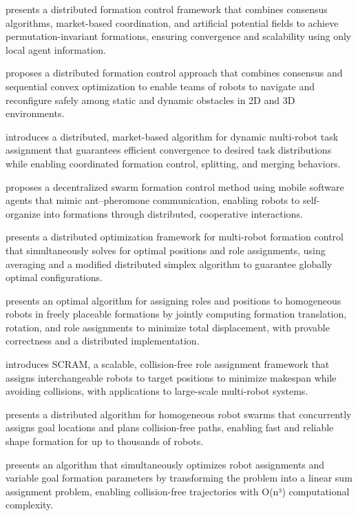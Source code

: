 \cite{zavlanos2007distributed} presents a distributed formation control framework that combines consensus algorithms, market-based coordination, and artificial potential fields to achieve permutation-invariant formations, ensuring convergence and scalability using only local agent information.

\cite{alonso2016distributed} proposes a distributed formation control approach that combines consensus and sequential convex optimization to enable teams of robots to navigate and reconfigure safely among static and dynamic obstacles in 2D and 3D environments.

\cite{michael2008distributed} introduces a distributed, market-based algorithm for dynamic multi-robot task assignment that guarantees efficient convergence to desired task distributions while enabling coordinated formation control, splitting, and merging behaviors.

\cite{kambayashi2018distributed} proposes a decentralized swarm formation control method using mobile software agents that mimic ant–pheromone communication, enabling robots to self-organize into formations through distributed, cooperative interactions.

\cite{montijano2014efficient} presents a distributed optimization framework for multi-robot formation control that simultaneously solves for optimal positions and role assignments, using averaging and a modified distributed simplex algorithm to guarantee globally optimal configurations.

\cite{mosteo2017optimal} presents an optimal algorithm for assigning roles and positions to homogeneous robots in freely placeable formations by jointly computing formation translation, rotation, and role assignments to minimize total displacement, with provable correctness and a distributed implementation.

\cite{macalpine2015scram} introduces SCRAM, a scalable, collision-free role assignment framework that assigns interchangeable robots to target positions to minimize makespan while avoiding collisions, with applications to large-scale multi-robot systems.

\cite{wang2020shape} presents a distributed algorithm for homogeneous robot swarms that concurrently assigns goal locations and plans collision-free paths, enabling fast and reliable shape formation for up to thousands of robots.

\cite{agarwal2018simultaneous} presents an algorithm that simultaneously optimizes robot assignments and variable goal formation parameters by transforming the problem into a linear sum assignment problem, enabling collision-free trajectories with O(n³) computational complexity.

